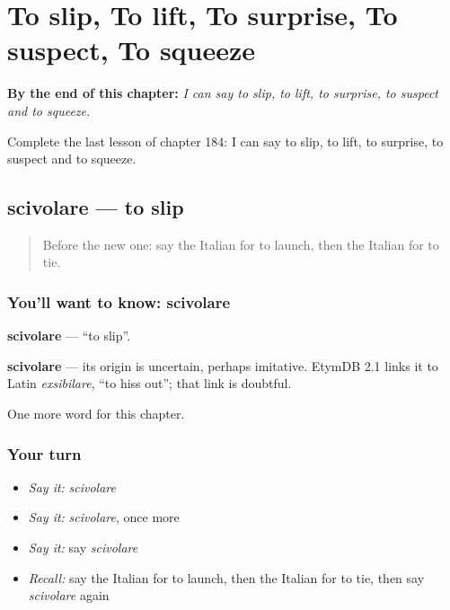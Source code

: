 
\chapter{To slip, To lift, To surprise, To suspect, To squeeze}
\label{ch:it-to-slip-to-lift-to-surprise-to-suspect-to-squeeze}

\begin{chapteropening}
\textbf{By the end of this chapter:} \emph{I can say to slip, to lift, to surprise, to suspect and to squeeze.}

Complete the last lesson of chapter 184: I can say to slip, to lift, to surprise, to suspect and to squeeze.
\end{chapteropening}

\section[scivolare]{scivolare — to slip}

\label{lesson:IT-C184-scivolare}



\begin{quote}
Before the new one: say the Italian for to launch, then the Italian for to tie.
\end{quote}

\subsection*{You'll want to know: scivolare}
\textbf{scivolare} — \textquotedblleft{}to slip\textquotedblright{}.

\begin{cousinweb}
\textbf{scivolare} — its origin is uncertain, perhaps imitative. EtymDB 2.1 links it to Latin \emph{exsibilare}, \textquotedblleft{}to hiss out\textquotedblright{}; that link is doubtful.
\end{cousinweb}

\begin{grammarlens}[title={What you've built}]
One more word for this chapter.
\end{grammarlens}

\subsection*{Your turn}
\begin{itemize}
\raggedright
  \item \emph{Say it:} \emph{scivolare}
  \item \emph{Say it:} \emph{scivolare}, once more
  \item \emph{Say it:} say \emph{scivolare}
  \item \emph{Recall:} say the Italian for to launch, then the Italian for to tie, then say \emph{scivolare} again
\end{itemize}

